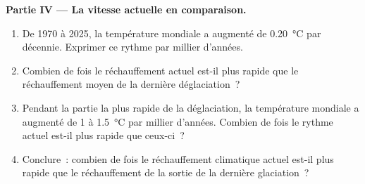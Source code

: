 \begin{problem}
\medskip
\noindent\textbf{Partie IV --- La vitesse actuelle en comparaison.}
\begin{enumerate}[resume]
  \item De 1970 à 2025, la température mondiale a augmenté de
        \qty{0.20}{\degreeCelsius} par décennie. Exprimer ce rythme par
        millier d'années.
  \item Combien de fois le réchauffement actuel est-il plus rapide que le
        réchauffement moyen de la dernière déglaciation~?
  \item Pendant la partie la plus rapide de la déglaciation, la température
        mondiale a augmenté de 1 à \qty{1.5}{\degreeCelsius} par millier
        d'années. Combien de fois le rythme actuel est-il plus rapide que
        ceux-ci~?
  \item Conclure~: combien de fois le réchauffement climatique actuel
        est-il plus rapide que le réchauffement de la sortie de la dernière
        glaciation~?
\end{enumerate}
\end{problem}

